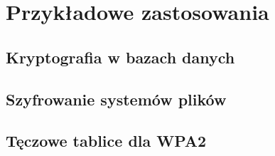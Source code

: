 \chapter{Przykładowe zastosowania}

\section{Kryptografia w bazach danych}

\section{Szyfrowanie systemów plików}

\section{Tęczowe tablice dla WPA2}

